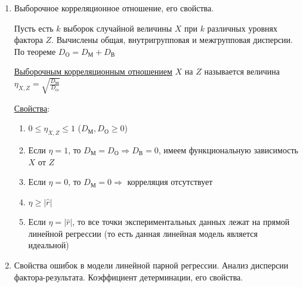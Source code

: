 \begin{enumerate}
    \begin{MyTheorem}
        Если $H_0$ верна, то $K = \frac{\hat r \sqrt{n - 2}}{\sqrt{n - \hat r^2}} \in T_{n - 2}$ -- распределение Стьюдента с степенью $n - 2$ 
    \end{MyTheorem}

    Получаем критерий. Пусть $t_\alpha$ -- квантиль $|T_{n - 2}|$ (двухстороннее распределение Стьюдента) уровня $\alpha$

    $\begin{cases}
        H_0 : r = 0, & \text{ если } |K| < t_\alpha \\
        H_1 : r \neq 0, & \text{ если } |K| \geq t_\alpha \\
    \end{cases}$

    \item Выборочное корреляционное отношение, его свойства.

    Пусть есть $k$ выборок случайной величины $X$ при $k$ различных уровнях фактора $Z$. Вычислены общая, внутригрупповая и межгрупповая дисперсии. 
    По теореме $D_\text{О} = D_\text{М} + D_\text{В}$

    \Def \hyperlink{selective_correlational_relation}{Выборочным корреляционным отношением} $X$ на $Z$ называется величина $\eta_{X, Z} = \sqrt{\frac{D_\text{М}}{D_\text{О}}}$

    \underline{Свойства}:

    \begin{enumerate}
        \item $0 \leq \eta_{X, Z} \leq 1$ ($D_\text{М}, D_\text{О} \geq 0$)

        \item Если $\eta = 1$, то $D_\text{М} = D_\text{О} \Longrightarrow D_\text{В} = 0$, имеем функциональную зависимость $X$ от $Z$

        \item Если $\eta = 0$, то $D_\text{М} = 0 \Longrightarrow$ корреляция отсутствует

        \item $\eta \geq |\hat r|$

        \item Если $\eta = |\hat r|$, то все точки экспериментальных данных лежат на прямой линейной регрессии 
        (то есть данная линейная модель является идеальной)

    \end{enumerate}

    \item Свойства ошибок в модели линейной парной регрессии. Анализ дисперсии фактора-результата. Коэффициент детерминации, его свойства.


\end{enumerate}
